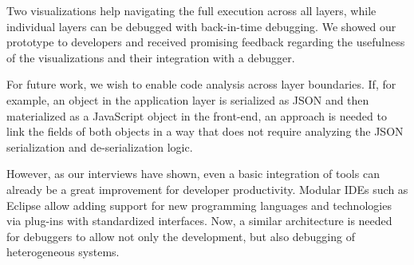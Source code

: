 Two visualizations help navigating the full execution across all layers, while individual layers can be debugged with back-in-time debugging.
We showed our prototype to developers and received promising feedback regarding the usefulness of the visualizations and their integration with a debugger.

For future work, we wish to enable code analysis across layer boundaries.
If, for example, an object in the application layer is serialized as JSON and then materialized as a JavaScript object in the front-end, an approach is needed to link the fields of both objects in a way that does not require analyzing the JSON serialization and de-serialization logic.

However, as our interviews have shown, even a basic integration of tools can already be a great improvement for developer productivity.
Modular IDEs such as Eclipse allow adding support for new programming languages and technologies via plug-ins with standardized interfaces.
Now, a similar architecture is needed for debuggers to allow not only the development, but also debugging of heterogeneous systems.

\tmpEnd